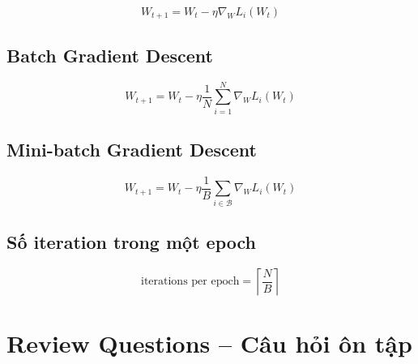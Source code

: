 \[
    W_{t+1}
    =
    W_t
    -
    \eta
    \nabla_W L_i(W_t)
\]

\subsection*{Batch Gradient Descent}

\[
    W_{t+1}
    =
    W_t
    -
    \eta
    \frac{1}{N}
    \sum_{i=1}^{N}
    \nabla_W L_i(W_t)
\]

\subsection*{Mini-batch Gradient Descent}

\[
    W_{t+1}
    =
    W_t
    -
    \eta
    \frac{1}{B}
    \sum_{i\in \mathcal{B}}
    \nabla_W L_i(W_t)
\]

\subsection*{Số iteration trong một epoch}

\[
    \text{iterations per epoch}
    =
    \left\lceil
    \frac{N}{B}
    \right\rceil
\]

\section{Review Questions -- Câu hỏi ôn tập}

